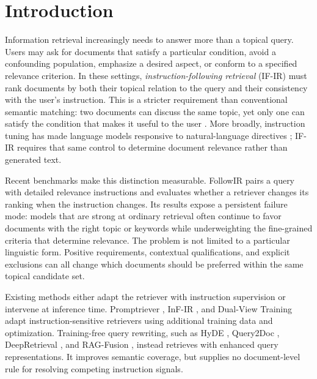 \documentclass[letterpaper]{article}
\begin{document}
\section{Introduction}
\label{sec:introduction}

Information retrieval increasingly needs to answer more than a topical
query.  Users may ask for documents that satisfy a particular condition,
avoid a confounding population, emphasize a desired aspect, or conform
to a specified relevance criterion.  In these settings,
\emph{instruction-following retrieval} (IF-IR) must rank documents by
both their topical relation to the query and their consistency with the
user's instruction.  This is a stricter requirement than conventional
semantic matching: two documents can discuss the same topic, yet only
one can satisfy the condition that makes it useful to the user
\cite{karpukhin2020dpr}.  More broadly, instruction tuning has made
language models responsive to natural-language directives
\cite{instructgpt2022,flan2022,t02022}; IF-IR requires that same
control to determine document relevance rather than generated text.

Recent benchmarks make this distinction measurable.  FollowIR
\cite{weller-etal-2025-followir} pairs a query with detailed relevance instructions
and evaluates whether a retriever changes its ranking when the
instruction changes.  Its results expose a persistent failure mode:
models that are strong at ordinary retrieval often continue to favor
documents with the right topic or keywords while underweighting the
fine-grained criteria that determine relevance.  The problem is not
limited to a particular linguistic form.  Positive requirements,
contextual qualifications, and explicit exclusions can all change which
documents should be preferred within the same topical candidate set.

Existing methods either adapt the retriever with instruction supervision
or intervene at inference time.  Promptriever \cite{weller2024promptriever},
InF-IR \cite{zhuang2025infir}, and Dual-View Training \cite{dualview2026}
adapt instruction-sensitive retrievers using additional training data and
optimization.  Training-free query rewriting, such as HyDE
\cite{gao2023hyde}, Query2Doc \cite{wang2023query2doc}, DeepRetrieval
\cite{li2025deepretrieval}, and RAG-Fusion \cite{raudaschl2024ragfusion},
instead retrieves with enhanced query representations.  It improves
semantic coverage, but supplies no document-level rule for resolving
competing instruction signals.
\end{document}
